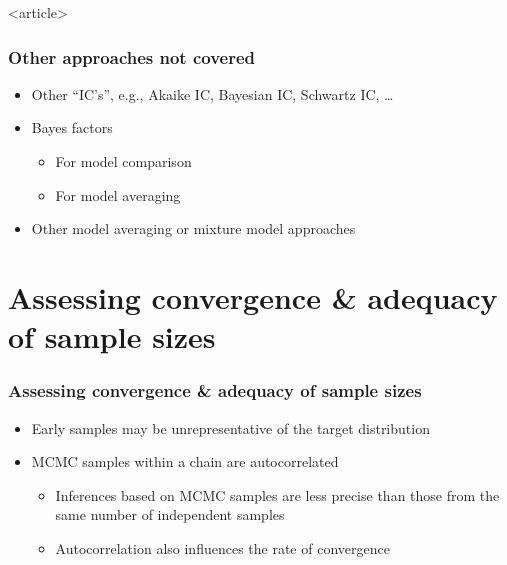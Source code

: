 \documentclass{beamer}
\begin{document}
\begin{frame}<article>
  \frametitle{Other approaches not covered}
  
  \begin{itemize}
  \item Other “IC’s”, e.g., Akaike IC, Bayesian IC, Schwartz IC, …
  \item Bayes factors
    \begin{itemize}
    \item For model comparison
    \item For model averaging
    \end{itemize}
  \item Other model averaging or mixture model approaches
  \end{itemize}

\end{frame}


\section{Assessing convergence \& adequacy of sample sizes}

\begin{frame}
  \frametitle{Assessing convergence \& adequacy of sample sizes}
  
\begin{itemize}
\item Early samples may be unrepresentative of the target distribution
\item MCMC samples within a chain are autocorrelated 
\begin{itemize}
\item Inferences based on MCMC samples are less precise than those from the same number of independent samples
\item Autocorrelation also influences the rate of convergence
\end{itemize}
\end{itemize}

\end{frame}
\end{document}
